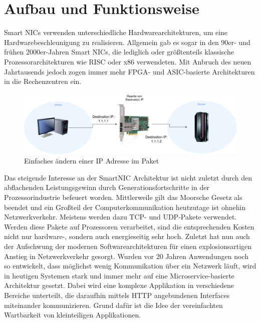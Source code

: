 \section{Aufbau und Funktionsweise}
Smart NICs verwenden unterschiedliche Hardwarearchitekturen, um eine Hardwarebeschleunigung zu realisieren. Allgemein gab es sogar in den 90er- und frühen 2000er-Jahren Smart NICs, die lediglich oder größtenteils klassische Prozessorarchitekturen wie RISC oder x86 verwendeten. Mit Anbruch des neuen Jahrtausends jedoch zogen immer mehr FPGA- und ASIC-basierte Architekturen in die Rechenzentren ein. \cite{towardsSmartNICCluster}
\begin{figure}
    \centering
    \includegraphics[width=1\linewidth]{images/GrundaufbauSmartNIC.drawio.png}
    \caption{Einfaches ändern einer IP Adresse im Paket}
    \label{fig:enter-label}
\end{figure}
Das steigende Interesse an der SmartNIC Architektur ist nicht zuletzt durch den abflachenden Leistungsgewinn durch Generationsfortschritte in der Prozessorindustrie befeuert worden. Mittlerweile gilt das Moorsche Gesetz als beendet und ein Großteil der Computerkommunikation heutzutage ist ohnehin Netzwerkverkehr. \cite{endofmoore} Meistens werden dazu TCP- und UDP-Pakete verwendet. Werden diese Pakete auf Prozessoren verarbeitet, sind die entsprechenden Kosten nicht nur hardware-, sondern auch energieseitig sehr hoch. Zuletzt hat nun auch der Aufschwung der modernen Softwarearchitekturen für einen explosionsartigen Anstieg in Netzwerkverkehr gesorgt. Wurden vor 20 Jahren Anwendungen noch so entwickelt, dass möglichst wenig Kommunikation über ein Netzwerk läuft, wird in heutigen Systemen stark und immer mehr auf eine Microservice-basierte Architektur gesetzt. \cite{microservices} Dabei wird eine komplexe Applikation in verschiedene Bereiche unterteilt, die daraufhin mittels HTTP angebundenen Interfaces miteinander kommunizieren. Grund dafür ist die Idee der vereinfachten Wartbarkeit von kleinteiligen Applikationen.
